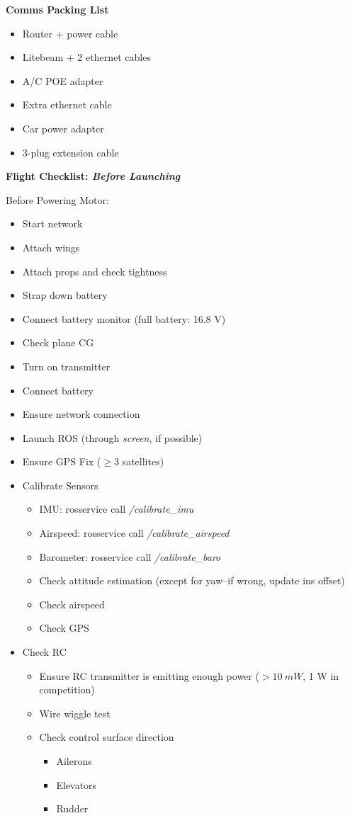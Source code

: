 \documentclass[]{auvsi_doc}
\begin{document}
\hrulefill

\textbf{Comms Packing List}
\begin{itemize}
	\item Router + power cable
	\item Litebeam + 2 ethernet cables
	\item A/C POE adapter
	\item Extra ethernet cable
	\item Car power adapter
	\item 3-plug extension cable
\end{itemize}

\hrulefill

\textbf{Flight Checklist: \textit{Before Launching}}

Before Powering Motor:

\begin{itemize}
	\item Start network
	\item Attach wings%
	\item Attach props and check tightness
	\item Strap down battery
	\item Connect battery monitor (full battery: 16.8 V)
	\item Check plane CG
	\item Turn on transmitter
	\item Connect battery
	\item Ensure network connection
	\item Launch ROS (through \textit{screen}, if possible)
	\item Ensure GPS Fix ($\geq 3$ satellites)
	\item Calibrate Sensors
	\begin{itemize}
		\item IMU: rosservice call \textit{/calibrate\_imu}
		\item Airspeed: rosservice call \textit{/calibrate\_airspeed}
		\item Barometer: rosservice call \textit{/calibrate\_baro}
		\item Check attitude estimation (except for yaw--if wrong, update ins offset)
		\item Check airspeed
		\item Check GPS
	\end{itemize}
	\item Check RC
	\begin{itemize}
		\item Ensure RC transmitter is emitting enough power ($>10~mW$, 1 W in competition)
		\item Wire wiggle test
		\item Check control surface direction
		\begin{itemize}
			\item Ailerons
			\item Elevators
			\item Rudder
		\end{itemize}
	\end{itemize}
\end{itemize}
\end{document}
